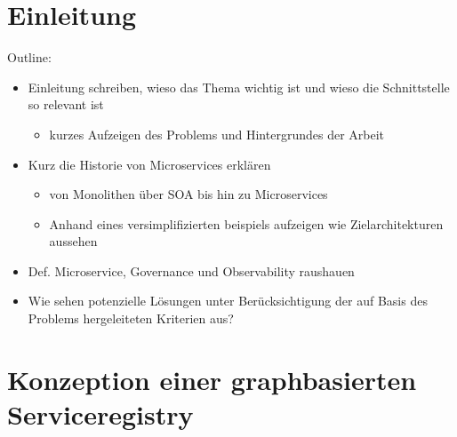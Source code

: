 \documentclass[
	12pt,
	BCOR=5mm,
	DIV=12,
	headinclude=on,
	footinclude=off,
	parskip=half,
	bibliography=totoc,
	listof=entryprefix,
	toc=listof,
	numbers=noenddot,
	plainfootsepline
]{scrreprt}
\begin{document}



\normalfont



\tableofcontents

\listoffigures




\clearpage
\ihead{\chaptername~\thechapter}
\ohead{\headmark}


\chapter{Einleitung}
Outline:
\begin{itemize}
	\item Einleitung schreiben, wieso das Thema wichtig ist und wieso die Schnittstelle so relevant ist
	\begin{itemize}
		\item kurzes Aufzeigen des Problems und Hintergrundes der Arbeit
	\end{itemize}
	\item Kurz die Historie von Microservices erklären
	\begin{itemize}
		\item von Monolithen über SOA bis hin zu Microservices
		\item Anhand eines versimplifizierten beispiels aufzeigen wie Zielarchitekturen aussehen
	\end{itemize}
	\item Def. Microservice, Governance und Observability raushauen
	\item Wie sehen potenzielle Lösungen unter Berücksichtigung der auf Basis des Problems hergeleiteten Kriterien aus?
\end{itemize}



\chapter{Konzeption einer graphbasierten Serviceregistry}
\end{document}
